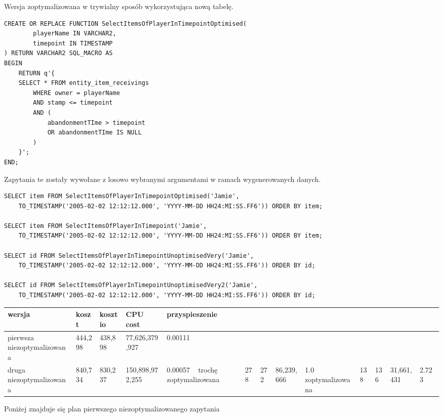 \documentclass[11pt]{article}
\numberwithin{figure}{subsection}
\begin{document}
		Wersja zoptymalizowana w trywialny sposób wykorzystująca nową tabelę.
			
		\begin{lstlisting}[caption={Wersja zoptymalizowana},captionpos=b]
CREATE OR REPLACE FUNCTION SelectItemsOfPlayerInTimepointOptimised(
		playerName IN VARCHAR2,
		timepoint IN TIMESTAMP
) RETURN VARCHAR2 SQL_MACRO AS
BEGIN
	RETURN q'{
	SELECT * FROM entity_item_receivings
		WHERE owner = playerName
		AND stamp <= timepoint
		AND (
			abandonmentTIme > timepoint
			OR abandonmentTIme IS NULL
		)
	}';
END;
		\end{lstlisting}
		
		Zapytania te zostały wywołane z losowo wybranymi argumentami w ramach
		wygenerowanych danych. \\
		
		\begin{lstlisting}[caption={Wywołanie zapytań}, captionpos=b]
SELECT item FROM SelectItemsOfPlayerInTimepointOptimised('Jamie',
	TO_TIMESTAMP('2005-02-02 12:12:12.000', 'YYYY-MM-DD HH24:MI:SS.FF6')) ORDER BY item;

SELECT item FROM SelectItemsOfPlayerInTimepoint('Jamie',
	TO_TIMESTAMP('2005-02-02 12:12:12.000', 'YYYY-MM-DD HH24:MI:SS.FF6')) ORDER BY item;

SELECT id FROM SelectItemsOfPlayerInTimepointUnoptimisedVery('Jamie',
	TO_TIMESTAMP('2005-02-02 12:12:12.000', 'YYYY-MM-DD HH24:MI:SS.FF6')) ORDER BY id;

SELECT id FROM SelectItemsOfPlayerInTimepointUnoptimisedVery2('Jamie',
	TO_TIMESTAMP('2005-02-02 12:12:12.000', 'YYYY-MM-DD HH24:MI:SS.FF6')) ORDER BY id;
		\end{lstlisting}
		
		\begin{tabularx}{\textwidth}{|X|X|X|X|X|}
			\hline
			wersja & koszt & koszt io & CPU cost & przyspieszenie \\
			\hline
			pierwsza niezoptymalizowana & 444,298 & 438,898 & 77,626,379,927 &
			0.00111 \\
			\hline
			druga niezoptymalizowana & 840,734 & 830,237 & 150,898,972,255 &
			0.00057 \
			\hline
			trochę zoptymalizowana & 278 & 272 & 86,239,666 & 1.0 \
			\hline
			zoptymalizowana & 138 & 136 & 31,661,431 & 2.723 \
			\hline
		\end{tabularx}
		
		Poniżej znajduje się plan pierwszego niezoptymalizowanego zapytania \\
		
\end{document}

